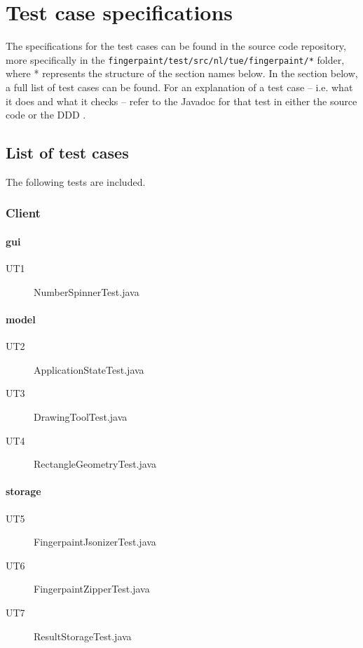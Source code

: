 \chapter{Test case specifications}\label{chap:testcasespec}

The specifications for the test cases can be found in the source code repository, more specifically in the \texttt{fingerpaint/test/src/nl/tue/fingerpaint/*} folder, where * represents the structure of the section names below. In the section below, a full list of test cases can be found. For an explanation of a test case -- i.e. what it does and what it checks -- refer to the Javadoc for that test in either the source code or the DDD \cite{DDD}.

\section{List of test cases}

The following tests are included.

\subsection{Client}
\subsubsection{gui}
\begin{description}
\item[UT1] NumberSpinnerTest.java
\end{description}
\subsubsection{model}
\begin{description}
\item[UT2] ApplicationStateTest.java
\item[UT3] DrawingToolTest.java
\item[UT4] RectangleGeometryTest.java
\end{description}
\subsubsection{storage}
\begin{description}
\item[UT5] FingerpaintJsonizerTest.java
\item[UT6] FingerpaintZipperTest.java
\item[UT7] ResultStorageTest.java
\end{description}

